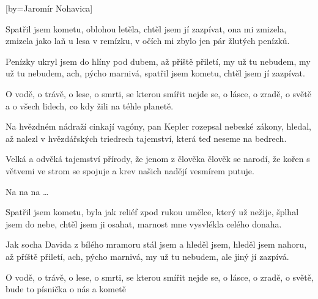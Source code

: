 [by={Jaromír Nohavica}]

\beginverse{}
Spatřil jsem kometu, oblohou letěla,
chtěl jsem jí zazpívat, ona mi zmizela,
zmizela jako laň u lesa v remízku,
v očích mi zbylo jen pár žlutých penízků.
\endverse{}

\beginverse{}
Penízky ukryl jsem do hlíny pod dubem,
až příště přiletí, my už tu nebudem,
my už tu nebudem, ach, pýcho marnivá,
spatřil jsem kometu, chtěl jsem jí zazpívat.
\endverse{}

\beginchorus{}
O vodě, o trávě, o lese,
o smrti, se kterou smířit nejde se, 
o lásce, o zradě, o světě
a o všech lidech, co kdy žili na téhle planetě. 
\endchorus{}

\beginverse{}
Na hvězdném nádraží cinkají vagóny,
pan Kepler rozepsal nebeské zákony,
hledal, až nalezl v hvězdářských triedrech
tajemství, která teď neseme na bedrech.
\endverse{}

\beginverse{}
Velká a odvěká tajemství přírody,
že jenom z člověka člověk se narodí,
že kořen s větvemi ve strom se spojuje
a krev našich nadějí vesmírem putuje.
\endverse{}

\beginchorus{}
Na na na \ldots{}          
\endchorus{}

\beginverse{}
Spatřil jsem kometu, byla jak reliéf
zpod rukou umělce, který už nežije,
šplhal jsem do nebe, chtěl jsem ji osahat,
marnost mne vysvlékla celého donaha.
\endverse{}

\beginverse{}
Jak socha Davida z bílého mramoru
stál jsem a hleděl jsem, hleděl jsem nahoru,
až příště přiletí, ach, pýcho marnivá,
my už tu nebudem, ale jiný jí zazpívá.
\endverse{}

\beginchorus{}
O vodě, o trávě, o lese,
o smrti, se kterou smířit nejde se, 
o lásce, o zradě, o světě,
bude to písnička o nás a kometě   
\endchorus{}

\endsong{}

